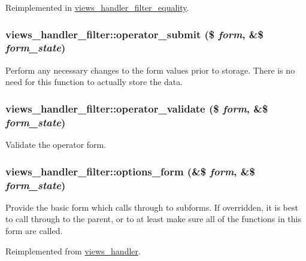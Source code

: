 Reimplemented in \hyperlink{classviews__handler__filter__equality_a65280b952e08acb863768f6316dbeb33}{views\_\-handler\_\-filter\_\-equality}.\hypertarget{classviews__handler__filter_ae9dbe89c9a8f6017492217c25d81ba53}{
\subsubsection[{operator\_\-submit}]{\setlength{\rightskip}{0pt plus 5cm}views\_\-handler\_\-filter::operator\_\-submit (\$ {\em form}, \/  \&\$ {\em form\_\-state})}}
\label{classviews__handler__filter_ae9dbe89c9a8f6017492217c25d81ba53}
Perform any necessary changes to the form values prior to storage. There is no need for this function to actually store the data. \hypertarget{classviews__handler__filter_a63a138e4e07e0537e2ece65bc7a9784e}{
\subsubsection[{operator\_\-validate}]{\setlength{\rightskip}{0pt plus 5cm}views\_\-handler\_\-filter::operator\_\-validate (\$ {\em form}, \/  \&\$ {\em form\_\-state})}}
\label{classviews__handler__filter_a63a138e4e07e0537e2ece65bc7a9784e}
Validate the operator form. \hypertarget{classviews__handler__filter_af14c69367162057a32709a6340de0988}{
\subsubsection[{options\_\-form}]{\setlength{\rightskip}{0pt plus 5cm}views\_\-handler\_\-filter::options\_\-form (\&\$ {\em form}, \/  \&\$ {\em form\_\-state})}}
\label{classviews__handler__filter_af14c69367162057a32709a6340de0988}
Provide the basic form which calls through to subforms. If overridden, it is best to call through to the parent, or to at least make sure all of the functions in this form are called. 

Reimplemented from \hyperlink{classviews__handler_aa41fcf16b177eb03e35facbae6320f74}{views\_\-handler}.

